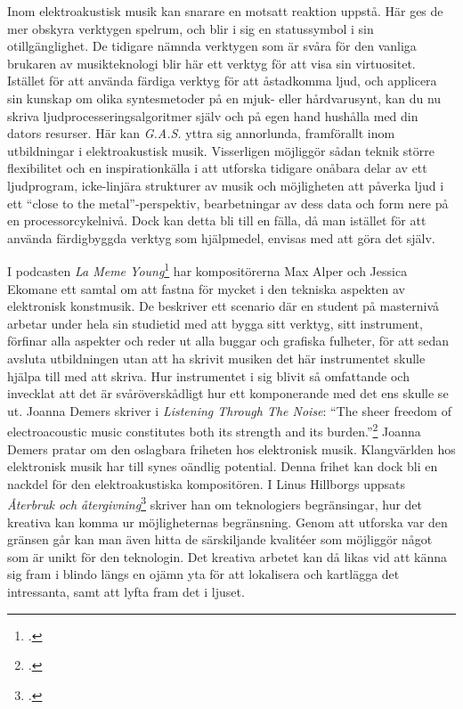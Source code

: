 \documentclass{article}
\begin{document}
Inom elektroakustisk musik kan snarare en motsatt reaktion uppstå. Här ges de mer obskyra verktygen spelrum,
och blir i sig en statussymbol i sin otillgänglighet. De tidigare nämnda verktygen som är svåra för den
vanliga brukaren av musikteknologi blir här ett verktyg för att visa sin virtuositet. Istället för att använda
färdiga verktyg för att åstadkomma ljud, och applicera sin kunskap om olika syntesmetoder på en mjuk- eller
hårdvarusynt, kan du nu skriva ljudprocesseringsalgoritmer själv och på egen hand hushålla med din dators
resurser. Här kan \emph{G.A.S.} yttra sig annorlunda, framförallt inom utbildningar i elektroakustisk
musik. Visserligen möjliggör sådan teknik större flexibilitet och en inspirationkälla i att utforska tidigare
onåbara delar av ett ljudprogram, icke-linjära strukturer av musik och möjligheten att påverka ljud i ett
``close to the metal''-perspektiv, bearbetningar av dess data och form nere på en processorcykelnivå. Dock kan
detta bli till en fälla, då man istället för att använda färdigbyggda verktyg som hjälpmedel, envisas med att
göra det själv.

I podcasten \emph{La Meme Young}\footcite{LaMemeYoung} har kompositörerna Max Alper och Jessica Ekomane ett
samtal om att fastna för mycket i den tekniska aspekten av elektronisk konstmusik. De beskriver ett scenario
där en student på masternivå arbetar under hela sin studietid med att bygga sitt verktyg, sitt instrument,
förfinar alla aspekter och reder ut alla buggar och grafiska fulheter, för att sedan avsluta utbildningen utan
att ha skrivit musiken det här instrumentet skulle hjälpa till med att skriva. Hur instrumentet i sig blivit
så omfattande och invecklat att det är svåröverskådligt hur ett komponerande med det ens skulle se ut. Joanna
Demers skriver i \emph{Listening Through The Noise}: ``The sheer freedom of electroacoustic music constitutes
both its strength and its burden.''\footcite{JoannaDemers} Joanna Demers pratar om den oslagbara friheten hos
elektronisk musik. Klangvärlden hos elektronisk musik har till synes oändlig potential.
Denna frihet kan dock bli en nackdel för den elektroakustiska kompositören. I Linus Hillborgs uppsats
\emph{Återbruk och återgivning}\footcite{LinusHillborg} skriver han om teknologiers begränsingar, hur det
kreativa kan komma ur möjligheternas begränsning. Genom att utforska var den gränsen går kan man även hitta de
särskiljande kvalitéer som möjliggör något som är unikt för den teknologin. Det kreativa arbetet kan då likas
vid att känna sig fram i blindo längs en ojämn yta för att lokalisera och kartlägga det intressanta, samt att
lyfta fram det i ljuset.
\end{document}
